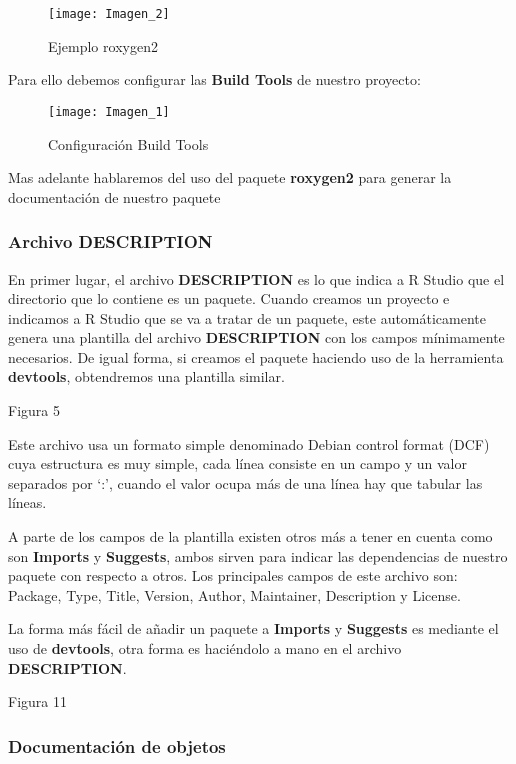 \begin{figure}[H]
    \centering
    \texttt{[image: Imagen\_2]}
    \caption{Ejemplo roxygen2   }
    \label{fig:figura1}
\end{figure} 

Para ello debemos configurar las \textbf{Build Tools} de nuestro proyecto:

\begin{figure}[H]
    \centering
    \texttt{[image: Imagen\_1]}
    \caption{Configuraci\'on Build Tools }
    \label{fig:figura1}
\end{figure} 

Mas adelante hablaremos del uso del paquete \textbf{roxygen2} para generar la documentación de nuestro paquete

\subsubsection{Archivo DESCRIPTION}

En primer lugar, el archivo \textbf{DESCRIPTION} es lo que indica a R Studio que el directorio que lo
contiene es un paquete. Cuando creamos un proyecto e indicamos a R Studio que se va a
tratar de un paquete, este autom\'aticamente genera una plantilla del archivo \textbf{DESCRIPTION}
con los campos m\'inimamente necesarios. De igual forma, si creamos el paquete haciendo uso de la herramienta \textbf{devtools}, obtendremos
una plantilla similar.

Figura 5

Este archivo usa un formato simple denominado Debian control format (DCF) cuya estructura
es muy simple, cada l\'inea consiste en un campo y un valor separados por \enquote*{:}, cuando el valor
ocupa m\'as de una l\'inea hay que tabular las l\'ineas.

A parte de los campos de la plantilla existen otros m\'as a tener en cuenta como son \textbf{Imports}
y \textbf{Suggests}, ambos sirven para indicar las dependencias de nuestro paquete con respecto a otros.
Los principales campos de este archivo son: Package, Type, Title, Version, Author, Maintainer, Description y License.

La forma m\'as f\'acil de a\~nadir un paquete a \textbf{Imports} y \textbf{Suggests} es mediante el uso de
\textbf{devtools}, otra forma es haci\'endolo a mano en el archivo \textbf{DESCRIPTION}.

Figura 11

\subsubsection{Documentaci\'on de objetos}

